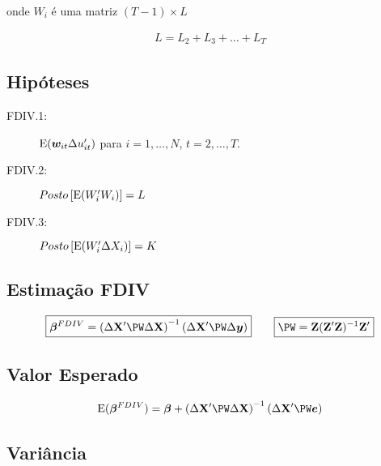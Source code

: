 \documentclass[11pt, oneside, a4paper, article]{article}
\numberwithin{equation}{section}
\begin{document}
\begin{description}
\noindent
onde $W_{i}$ é uma matriz $( T - 1 ) \times L$

\vspace{-1 em}
\begin{align*}
L = L_{2} + L_{3} + \dots + L_{T}
\end{align*}

\subsection{Hipóteses}

\begin{description}
\item[FDIV.1:] $\text{E}( \boldsymbol{w}_{it} \Delta u_{it}')$ para $i = 1, \dots, N$, $t = 2, \dots, T$.
\item[FDIV.2:] $Posto\left[ \text{E}( W_{i}' W_{i} ) \right] = L$
\item[FDIV.3:] $Posto\left[ \text{E}( W_{i}' \Delta X_{i} ) \right] = K$
\end{description}

\subsection{Estimação FDIV}

\vspace{-1 em}
\begin{align*}
\boxed{
\betavec^{FDIV} =  
\left(
\Delta \Xmat' \PW \Delta \Xmat 
\right)^{-1}
\left(
\Delta \Xmat' \PW \Delta \yvec
\right)
}
\qquad
\boxed{
\PW = \Wmat (\Wmat' \Wmat)^{-1} \Wmat'}
\end{align*}

\subsection{Valor Esperado}

\vspace{-1 em}
\begin{align*}
\E( \betavec^{FDIV} ) =  
\betavec + 
\left( \Delta \Xmat' \PW \Delta \Xmat \right)^{-1}
\left( \Delta \Xmat' \PW \mbs{e} \right)
\end{align*}

\subsection{Variância}


\end{description}
\end{document}
